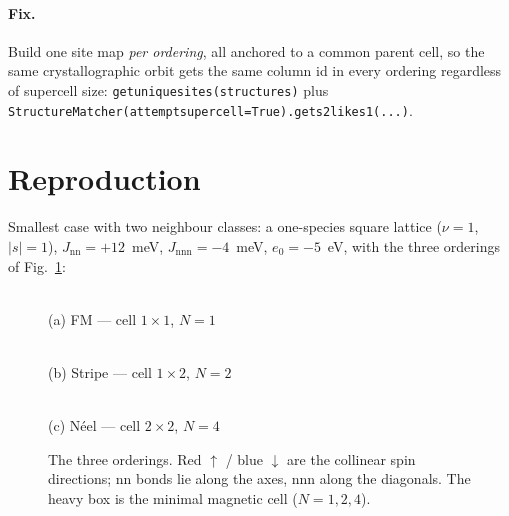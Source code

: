\documentclass[11pt]{article}
\newcommand{\code}[1]{\texttt{\def\_{\textunderscore\allowbreak}#1}}
\begin{document}
\paragraph{Fix.} Build one site map \emph{per ordering}, all anchored to a common
parent cell, so the same crystallographic orbit gets the same column id in every
ordering regardless of supercell size: \code{\_get\_unique\_sites(structures)}
plus \code{StructureMatcher(attempt\_supercell=True).get\_s2\_like\_s1(...)}.

\section{Reproduction}
\label{sec:repro}

Smallest case with two neighbour classes: a one-species square lattice
($\nu=1$, $|s|=1$), $J_{\mathrm{nn}}=+12$~meV, $J_{\mathrm{nnn}}=-4$~meV,
$e_0=-5$~eV, with the three orderings of Fig.~\ref{fig:orderings}:

\begin{figure}[h]
\centering
\begin{minipage}[t]{0.31\textwidth}\centering
{}\\[3pt]
{\footnotesize (a) FM --- cell $1\times1$, $N=1$}
\end{minipage}
\hfill
\begin{minipage}[t]{0.31\textwidth}\centering
{}\\[3pt]
{\footnotesize (b) Stripe --- cell $1\times2$, $N=2$}
\end{minipage}
\hfill
\begin{minipage}[t]{0.31\textwidth}\centering
{}\\[3pt]
{\footnotesize (c) N\'eel --- cell $2\times2$, $N=4$}
\end{minipage}
\caption{The three orderings. Red $\uparrow$ / blue $\downarrow$ are the collinear
spin directions; nn bonds lie along the axes, nnn along the diagonals. The heavy
box is the minimal magnetic cell ($N=1,2,4$).}
\label{fig:orderings}
\end{figure}
\end{document}
